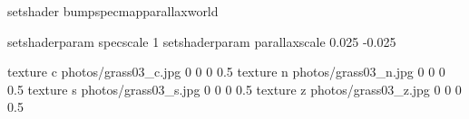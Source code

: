 setshader bumpspecmapparallaxworld

setshaderparam specscale 1
setshaderparam parallaxscale 0.025 -0.025

texture c photos/grass03_c.jpg 0 0 0 0.5
texture n photos/grass03_n.jpg 0 0 0 0.5
texture s photos/grass03_s.jpg 0 0 0 0.5
texture z photos/grass03_z.jpg 0 0 0 0.5
